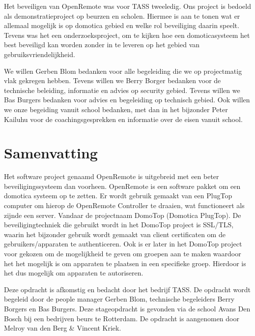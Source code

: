 \documentclass[]{article}
\begin{document}
Het beveiligen van OpenRemote was voor TASS tweeledig. Ons project is bedoeld als
demonstratieproject op beurzen en scholen. Hiermee is aan te tonen wat er
allemaal mogelijk is op domotica gebied en welke rol beveiliging daarin speelt.
Tevens was het een onderzoeksproject, om te kijken hoe een domoticasysteem
het best beveiligd kan worden zonder in te leveren op het gebied van
gebruiksvriendelijkheid.

We willen Gerben Blom bedanken voor alle begeleiding die we op projectmatig vlak
gekregen hebben. Tevens willen we Berry Borger bedanken voor de technische
beleiding, informatie en advies op security gebied. Tevens willen we Bas Burgers
bedanken voor advies en begeleiding op technisch gebied. Ook willen we onze
begeiding vanuit school bedanken, met dan in het bijzonder Peter Kailuhu voor
de coachingsgesprekken en informatie over de eisen vanuit school.

\newpage
\tableofcontents
\newpage
\listoftables
\listoffigures

\newpage
\section*{Samenvatting}
Het software project genaamd OpenRemote is uitgebreid met een beter
beveiligingssysteem dan voorheen. OpenRemote is een software
pakket om een domotica systeem op te zetten. Er wordt gebruik gemaakt van
een PlugTop computer om hierop de OpenRemote Controller te draaien, wat functioneert als
zijnde een server. Vandaar de projectnaam DomoTop (Domotica PlugTop).
De beveiligingtechniek die gebruikt wordt in het DomoTop project is SSL/TLS,
waarin het bijzonder gebruik wordt gemaakt van client certificaten om de
gebruikers/apparaten te authenticeren. Ook is er later in het DomoTop project
voor gekozen om de mogelijkheid te geven om groepen aan te maken waardoor
het het mogelijk is om apparaten te plaatsen in een specifieke groep. Hierdoor
is het dus mogelijk om apparaten te autoriseren.

Deze opdracht is afkomstig en bedacht door het bedrijf TASS. De opdracht wordt
begeleid door de people manager Gerben Blom, technische begeleiders Berry
Borgers en Bas Burgers. Deze stageopdracht is gevonden via de school Avans Den
Bosch bij een bedrijven beurs te Rotterdam. De opdracht is aangenomen door
Melroy van den Berg \& Vincent Kriek.

\end{document}
